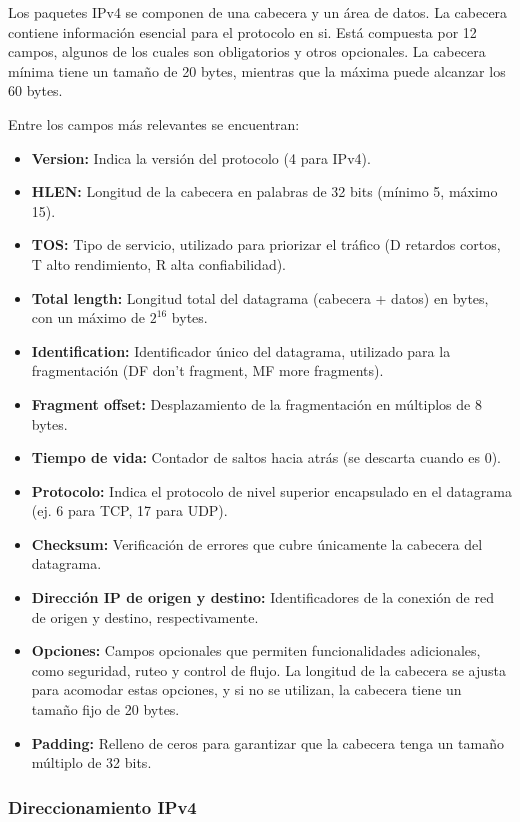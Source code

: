 Los paquetes IPv4 se componen de una cabecera y un área de datos. La cabecera contiene información esencial para el protocolo en si. Está compuesta por 12 campos, algunos de los cuales son obligatorios y otros opcionales. La cabecera mínima tiene un tamaño de 20 bytes, mientras que la máxima puede alcanzar los 60 bytes.

Entre los campos más relevantes se encuentran:
\begin{itemize}
  \item \textbf{Version:} Indica la versión del protocolo (4 para IPv4).
  \item \textbf{HLEN:} Longitud de la cabecera en palabras de 32 bits (mínimo 5, máximo 15).
  \item \textbf{TOS:} Tipo de servicio, utilizado para priorizar el tráfico (D retardos cortos, T alto rendimiento, R alta confiabilidad).
  \item \textbf{Total length:} Longitud total del datagrama (cabecera + datos) en bytes, con un máximo de $2^{16}$ bytes.
  \item \textbf{Identification:} Identificador único del datagrama, utilizado para la fragmentación (DF don't fragment, MF more fragments).
  \item \textbf{Fragment offset:} Desplazamiento de la fragmentación en múltiplos de 8 bytes.
  \item \textbf{Tiempo de vida:} Contador de saltos hacia atrás (se descarta cuando es 0).
  \item \textbf{Protocolo:} Indica el protocolo de nivel superior encapsulado en el datagrama (ej. 6 para TCP, 17 para UDP).
  \item \textbf{Checksum:} Verificación de errores que cubre únicamente la cabecera del datagrama.
  \item \textbf{Dirección IP de origen y destino:} Identificadores de la conexión de red de origen y destino, respectivamente.
  \item \textbf{Opciones:} Campos opcionales que permiten funcionalidades adicionales, como seguridad, ruteo y control de flujo. La longitud de la cabecera se ajusta para acomodar estas opciones, y si no se utilizan, la cabecera tiene un tamaño fijo de 20 bytes.
  \item \textbf{Padding:} Relleno de ceros para garantizar que la cabecera tenga un tamaño múltiplo de 32 bits.
\end{itemize}

\subsubsection{Direccionamiento IPv4}

